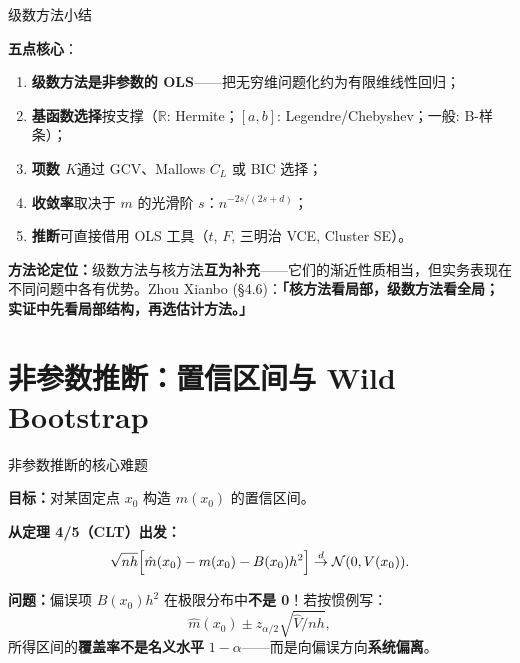 \documentclass[aspectratio=169, 10pt]{beamer}
\begin{document}
\begin{frame}{级数方法小结}

  \begin{highlightbox}
    \textbf{五点核心}：
    \begin{enumerate}
      \item \textbf{级数方法是非参数的 OLS}——把无穷维问题化约为有限维线性回归；
      \item \textbf{基函数选择}按支撑（$\mathbb{R}$: Hermite；$[a,b]$: Legendre/Chebyshev；一般: B-样条）；
      \item \textbf{项数 $K$}通过 GCV、Mallows $C_L$ 或 BIC 选择；
      \item \textbf{收敛率}取决于 $m$ 的光滑阶 $s$：$n^{-2s/(2s+d)}$；
      \item \textbf{推断}可直接借用 OLS 工具（$t$, $F$, 三明治 VCE, Cluster SE）。
    \end{enumerate}
  \end{highlightbox}


  \begin{keybox}
    \textbf{方法论定位：}级数方法与核方法\textbf{互为补充}——它们的渐近性质相当，但实务表现在不同问题中各有优势。Zhou Xianbo (§4.6)：\textbf{「核方法看局部，级数方法看全局；实证中先看局部结构，再选估计方法。」}
  \end{keybox}

\end{frame}



\section{非参数推断：置信区间与 Wild Bootstrap}

\begin{frame}{非参数推断的核心难题}

  \textbf{目标：}对某固定点 $x_0$ 构造 $m(x_0)$ 的置信区间。

  \textbf{从定理 4/5（CLT）出发：}
  \[
    \sqrt{nh}\Bigl[\hat m(x_0) - m(x_0) - B(x_0) h^2\Bigr] \overset{d}{\to} \mathcal{N}(0, V(x_0)).
  \]

  \textbf{问题：}偏误项 $B(x_0)h^2$ 在极限分布中\textbf{不是 0}！若按惯例写：
  \[
    \hat m(x_0) \pm z_{\alpha/2}\sqrt{\hat V/nh},
  \]
  所得区间的\textbf{覆盖率不是名义水平} $1-\alpha$——而是向偏误方向\textbf{系统偏离}。

\end{frame}
\end{document}
